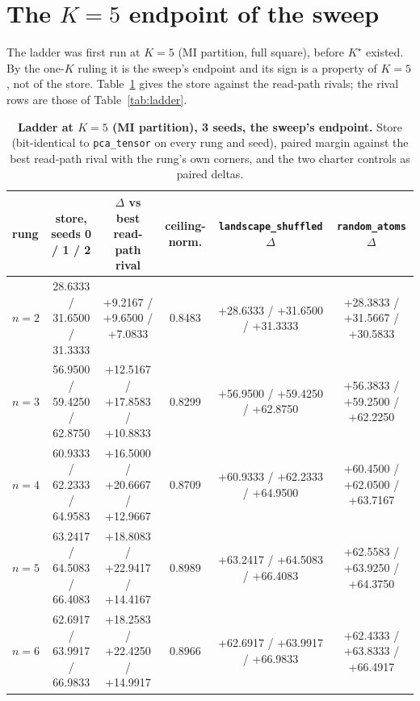 \documentclass{article} %
\newcommand{\Kstar}{\ensuremath{K^{\star}}}
\begin{document}
\section{The $K=5$ endpoint of the sweep}
\label{app:k5}

The ladder was first run at $K=5$ (MI partition, full square), before $\Kstar$ existed. By the
one-$K$ ruling it is the sweep's endpoint and its sign is a property of $K=5$, not of the store.
Table~\ref{tab:k5} gives the store against the read-path rivals; the rival rows are those of
Table~\ref{tab:ladder}.

\begin{table}[h]
\centering\small
\caption{\textbf{Ladder at $K=5$ (MI partition), 3 seeds, the sweep's endpoint.} Store
(bit-identical to \texttt{pca\_tensor} on every rung and seed), paired margin against the best
read-path rival with the rung's own corners, and the two charter controls as paired deltas.}
\label{tab:k5}
\setlength{\tabcolsep}{2.4pt}
\begin{tabular}{lccccc}
\toprule
rung & store, seeds 0 / 1 / 2 & $\Delta$ vs best read-path rival & ceiling-norm. & \texttt{landscape\_shuffled} $\Delta$ & \texttt{random\_atoms} $\Delta$ \\
\midrule
$n=2$ & 28.6333 / 31.6500 / 31.3333 & +9.2167 / +9.6500 / +7.0833 & 0.8483 & +28.6333 / +31.6500 / +31.3333 & +28.3833 / +31.5667 / +30.5833 \\
$n=3$ & 56.9500 / 59.4250 / 62.8750 & +12.5167 / +17.8583 / +10.8833 & 0.8299 & +56.9500 / +59.4250 / +62.8750 & +56.3833 / +59.2500 / +62.2250 \\
$n=4$ & 60.9333 / 62.2333 / 64.9583 & +16.5000 / +20.6667 / +12.9667 & 0.8709 & +60.9333 / +62.2333 / +64.9500 & +60.4500 / +62.0500 / +63.7167 \\
$n=5$ & 63.2417 / 64.5083 / 66.4083 & +18.8083 / +22.9417 / +14.4167 & 0.8989 & +63.2417 / +64.5083 / +66.4083 & +62.5583 / +63.9250 / +64.3750 \\
$n=6$ & 62.6917 / 63.9917 / 66.9833 & +18.2583 / +22.4250 / +14.9917 & 0.8966 & +62.6917 / +63.9917 / +66.9833 & +62.4333 / +63.8333 / +66.4917 \\
\bottomrule
\end{tabular}
\end{table}
\end{document}
